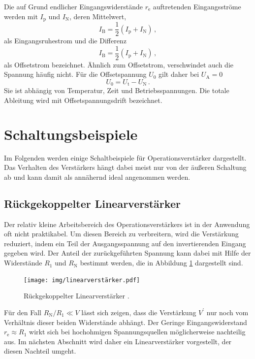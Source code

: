 Die auf Grund endlicher Eingangswiderstände $r_\text{e}$ auftretenden
Eingangsströme werden mit $I_\text{p}$ und $I_\text{N}$, deren
Mittelwert,
\begin{equation}
\label{eq:eingangsruhestrom}
    I_\text{B} = \frac{1}{2}\left(I_\text{p} + I_\text{N}\right)\,,
\end{equation}
als Eingangsruhestrom und die Differenz
\begin{equation}
\label{eq:offsetstrom}
    I_\text{B} = \frac{1}{2}\left(I_\text{p} + I_\text{N}\right)\,,
\end{equation}
als Offsetstrom bezeichnet.
Ähnlich zum Offsetstrom, verschwindet auch die Spannung häufig nicht.
Für die Offsetspannung $U_0$ gilt daher bei $U_\text{A} = 0$
\begin{equation}
\label{eq:offsetspannung}
    U_0 = U_\text{t} - U_\text{N}\,.
\end{equation}
Sie ist abhängig von Temperatur, Zeit und Betriebsspannungen. Die totale
Ableitung wird mit Offsetspannungsdrift bezeichnet.


\section{Schaltungsbeispiele}
\label{sec:schaltungsbeispiele}
Im Folgenden werden einige Schaltbeispiele für Operationsverstärker
dargestellt. Das Verhalten des Verstärkers hängt dabei meist nur von der
äußeren Schaltung ab und kann damit als annähernd ideal angenommen werden.

\subsection{Rückgekoppelter Linearverstärker}
\label{subsec:rück-linearverstärker}
Der relativ kleine Arbeitsbereich des Operationsverstärkers ist in der
Anwendung oft nicht praktikabel. Um diesen Bereich zu verbreitern, wird die
Verstärkung reduziert, indem ein Teil der Ausgangsspannung auf den
invertierenden Eingang gegeben wird.
Der Anteil der zurückgeführten Spannung kann dabei mit Hilfe der Widerstände
$R_1$ und $R_\text{N}$ bestimmt werden, die in Abbildung \ref{fig:linear}
dargestellt sind.
\begin{figure}
    \centering
    \texttt{[image: img/linearverstärker.pdf]}
    \caption{Rückgekoppelter Linearverstärker \cite{V51}.}
    \label{fig:linear}
\end{figure}
Für den Fall $R_\text{N}/R_1 \ll V$
lässt sich zeigen, dass die Verstärkung $V^\prime$ nur noch vom Verhältnis
dieser beiden Widerstände abhängt.
Der Geringe Eingangswiderstand $r_\text{e} \approx R_1$ wirkt sich bei
hochohmigen Spannungsquellen möglicherweise nachteilig aus. Im nächsten
Abschnitt wird daher ein Linearverstärker vorgestellt, der diesen Nachteil
umgeht.

